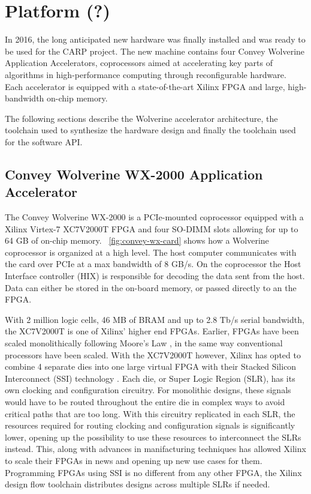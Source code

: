 
\chapter{Platform (?)}

In 2016, the long anticipated new hardware was finally installed and was ready
to be used for the CARP project. The new machine contains four Convey Wolverine
Application Accelerators, coprocessors aimed at accelerating key parts of
algorithms in high-performance computing through reconfigurable hardware. Each
accelerator is equipped with a state-of-the-art Xilinx FPGA and large,
high-bandwidth on-chip memory.

The following sections describe the Wolverine accelerator architecture, the
toolchain used to synthesize the hardware design and finally the toolchain used
for the software API.

\section{Convey Wolverine WX-2000 Application Accelerator}

The Convey Wolverine WX-2000 is a PCIe-mounted coprocessor equipped with a
Xilinx Virtex-7 XC7V2000T FPGA and four SO-DIMM slots allowing for up to 64 GB
of on-chip memory. \figurename~\ref{fig:convey-wx-card} shows how a Wolverine
coprocessor is organized at a high level. The host computer communicates with
the card over PCIe at a max bandwidth of 8 GB/s. On the coprocessor the Host
Interface controller (HIX) is responsible for decoding the data sent from the
host. Data can either be stored in the on-board memory, or passed directly to an
the FPGA.

With 2 million logic cells, 46 MB of BRAM and up to 2.8 Tb/s serial bandwidth,
the XC7V2000T is one of Xilinx' higher end FPGAs. Earlier, FPGAs have been
scaled monolithically following Moore's Law , in the same way
conventional processors have been scaled. With the XC7V2000T however, Xilinx has
opted to combine 4 separate dies into one large virtual FPGA with their Stacked
Silicon Interconnect (SSI) technology \cite{Saban2011}. Each die, or Super Logic
Region (SLR), has its own clocking and configuration circuitry. For monolithic
designs, these signals would have to be routed throughout the entire die in
complex ways to avoid critical paths that are too long. With this circuitry
replicated in each SLR, the resources required for routing clocking and
configuration signals is significantly lower, opening up the possibility to use
these resources to interconnect the SLRs instead. This, along with advances in
manifacturing techniques has allowed Xilinx to scale their FPGAs in news and
opening up new use cases for them. Programming FPGAs using SSI is no different
from any other FPGA, the Xilinx design flow toolchain distributes designs across
multiple SLRs if needed.


